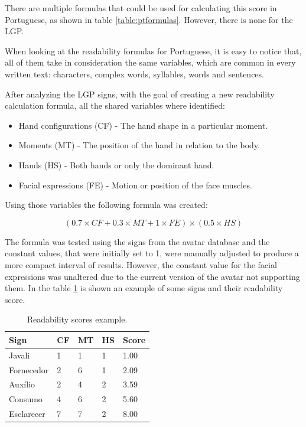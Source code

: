 \documentclass[runningheads]{llncs}
\begin{document}
There are multiple formulas that could be used for calculating this score in Portuguese, as shown in table \ref{table:ptformulas}.
However, there is none for the LGP.

When looking at the readability formulas for Portuguese, it is easy to notice that, all of them take in consideration the same variables, which are common in every written text: characters, complex words, syllables, words and sentences.

After analyzing the LGP signs, with the goal of creating a new readability calculation formula, all the shared variables where identified:

\begin{itemize}
    \item Hand configurations (CF) - The hand shape in a particular moment.
    \item Moments (MT) - The position of the hand in relation to the body.
    \item Hands (HS) - Both hands or only the dominant hand.
    \item Facial expressions (FE) - Motion or position of the face muscles.
\end{itemize}

Using those variables the following formula was created:

\begin{equation}
(0.7 \times CF + 0.3 \times MT + 1 \times FE) \times (0.5 \times HS)
\label{eqn1}
\end{equation}

The formula was tested using the signs from the avatar database and the constant values, that were initially set to 1, were manually adjusted to produce a more compact interval of results.
However, the constant value for the facial expressions was unaltered due to the current version of the avatar not supporting them.
In the table \ref{table:signs} is shown an example of some signs and their readability score.

\begin{table}[H]
    \centering
    \caption{Readability scores example.}
    \label{table:signs}
    \begin{tabular}{l|l|l|l|l}
        {\bfseries Sign} & {\bfseries CF} & {\bfseries MT} & {\bfseries HS} & {\bfseries Score} \\
        \hline
        Javali & 1 & 1 & 1 & 1.00  \\
        \hline
        Fornecedor & 2 & 6 & 1 & 2.09  \\
        \hline
        Auxílio & 2 & 4 & 2 & 3.59 \\
        \hline
        Consumo & 4 & 6 & 2 & 5.60 \\
        \hline
        Esclarecer & 7 & 7 & 2 & 8.00 \\
    \end{tabular}
\end{table}
\end{document}
